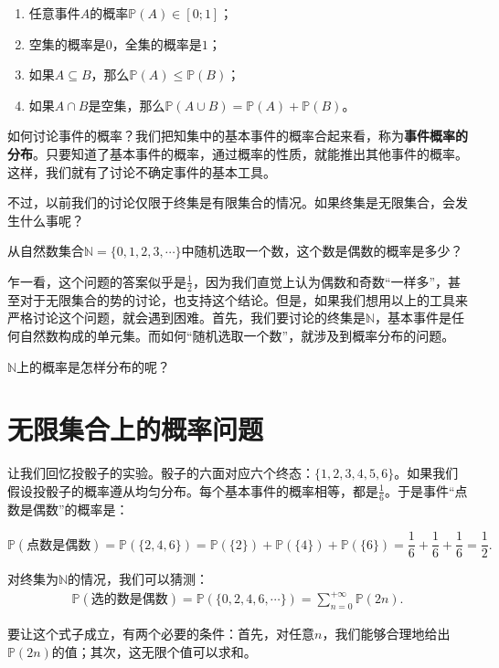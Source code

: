 \documentclass[12pt,UTF8,fontset=none]{ctexbook}
\begin{document}
\begin{enumerate}
    \item 任意事件$A$的概率$\mathbb{P}(A)\in[0;1]$；
    \item 空集的概率是$0$，全集的概率是$1$；
    \item 如果$A\subseteq B$，那么$\mathbb{P}(A)\leqslant \mathbb{P}(B)$；
    \item 如果$A\cap B$是空集，那么$\mathbb{P}(A\cup B) = \mathbb{P}(A) + \mathbb{P}(B)$。
\end{enumerate}

如何讨论事件的概率？我们把知集中的基本事件的概率合起来看，称为\textbf{事件概率的分布}。只要知道了基本事件的概率，通过概率的性质，就能推出其他事件的概率。这样，我们就有了讨论不确定事件的基本工具。

不过，以前我们的讨论仅限于终集是有限集合的情况。如果终集是无限集合，会发生什么事呢？

\begin{ex}
    从自然数集合$\mathbb{N} = \{0,1,2,3,\cdots\}$中随机选取一个数，这个数是偶数的概率是多少？
\end{ex}

乍一看，这个问题的答案似乎是$\frac{1}{2}$，因为我们直觉上认为偶数和奇数“一样多”，甚至对于无限集合的势的讨论，也支持这个结论。但是，如果我们想用以上的工具来严格讨论这个问题，就会遇到困难。首先，我们要讨论的终集是$\mathbb{N}$，基本事件是任何自然数构成的单元集。而如何“随机选取一个数”，就涉及到概率分布的问题。

$\mathbb{N}$上的概率是怎样分布的呢？

\section{无限集合上的概率问题}

让我们回忆投骰子的实验。骰子的六面对应六个终态：$\{1,2,3,4,5,6\}$。如果我们假设投骰子的概率遵从均匀分布。每个基本事件的概率相等，都是$\frac{1}{6}$。于是事件“点数是偶数”的概率是：

$$ \mathbb{P}(\mbox{点数是偶数}) = \mathbb{P}(\{2,4,6\}) = \mathbb{P}(\{2\}) + \mathbb{P}(\{4\}) + \mathbb{P}(\{6\}) = \frac{1}{6} + \frac{1}{6} + \frac{1}{6} = \frac{1}{2}.$$

对终集为$\mathbb{N}$的情况，我们可以猜测：
\begin{align*}
    \mathbb{P}(\mbox{选的数是偶数}) = \mathbb{P}(\{0,2,4,6,\cdots\}) = \sum_{n=0}^{+\infty} \mathbb{P}(2n).
\end{align*}

要让这个式子成立，有两个必要的条件：首先，对任意$n$，我们能够合理地给出$\mathbb{P}(2n)$的值；其次，这无限个值可以求和。
\end{document}
